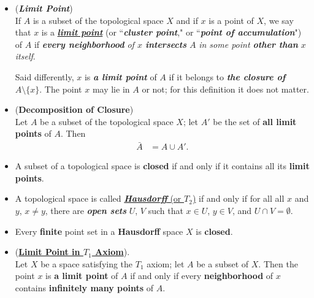 \documentclass[11pt]{article}
\begin{document}
\begin{itemize}
\item \begin{definition} (\emph{\textbf{Limit Point}})\\
If $A$ is a subset of the topological space $X$ and if $x$ is a point of $X$, we say that $x$ is a \underline{\emph{\textbf{limit point}}} (or ``\emph{\textbf{cluster point}}," or ``\emph{\textbf{point of accumulation}}") of $A$ if \emph{\textbf{every neighborhood} of $x$ \textbf{intersects} $A$} \emph{in some point \textbf{other than} $x$ itself}. 

Said differently, $x$ is \emph{\textbf{a limit point}} of $A$ if it belongs to \emph{\textbf{the closure of $A \setminus \{x\}$}}. The point $x$ may lie in $A$ or not; for this definition it does not matter.
\end{definition}

\item \begin{theorem} (\textbf{Decomposition of Closure})\\
Let $A$ be a subset of the topological space $X$; let $A'$ be the set of \textbf{all limit points} of $A$. Then
\begin{align*}
\bar{A} &= A \cup A'.
\end{align*}
\end{theorem}

\item \begin{corollary}
A subset of a topological space is \textbf{closed} if and only if it contains all its \textbf{limit points}.
\end{corollary}

\item \begin{definition}
A topological space is called \underline{\emph{\textbf{Hausdorff}} (or $T_2$)} if and only if for all all $x$ and $y$, $x\neq y$, there are \emph{\textbf{open sets}}  $U$,  $V$ such that $x \in U$, $y \in V$, and $U \cap V = \emptyset$.
\end{definition}

\item \begin{proposition}
Every \textbf{finite} point set in a \textbf{Hausdorff} space $X$ is \textbf{closed}.
\end{proposition}

\item \begin{proposition} (\underline{\textbf{Limit Point in $T_1$ Axiom}}). \citep{munkres2000topology} \\
Let $X$ be a space satisfying the $T_1$ axiom; let $A$ be a subset of $X$. Then the point $x$ is \textbf{a limit point} of $A$ if and only if every \textbf{neighborhood} of $x$ contains \textbf{infinitely many points} of $A$.
\end{proposition}


\end{itemize}
\end{document}
